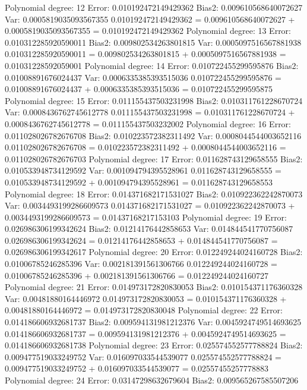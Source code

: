 \documentclass[letterpaper,10pt,english]{sphinxmanual}
\begin{document}
\begin{sphinxVerbatim}[commandchars=\\\{\}]
Polynomial degree: 12
Error: 0.010192472149429362
Bias\PYGZca{}2: 0.009610568640072627
Var: 0.0005819035093567355
0.010192472149429362 \PYGZgt{}= 0.009610568640072627 + 0.0005819035093567355 = 0.010192472149429362
Polynomial degree: 13
Error: 0.010312285920590011
Bias\PYGZca{}2: 0.009802534263801815
Var: 0.0005097516567881938
0.010312285920590011 \PYGZgt{}= 0.009802534263801815 + 0.0005097516567881938 = 0.01031228592059001
Polynomial degree: 14
Error: 0.010722455299595876
Bias\PYGZca{}2: 0.01008891676024437
Var: 0.0006335385393515036
0.010722455299595876 \PYGZgt{}= 0.01008891676024437 + 0.0006335385393515036 = 0.010722455299595875
Polynomial degree: 15
Error: 0.011155437503231998
Bias\PYGZca{}2: 0.010311761228670724
Var: 0.0008436762745612778
0.011155437503231998 \PYGZgt{}= 0.010311761228670724 + 0.0008436762745612778 = 0.011155437503232002
Polynomial degree: 16
Error: 0.011028026782676708
Bias\PYGZca{}2: 0.010223572382311492
Var: 0.0008044544003652116
0.011028026782676708 \PYGZgt{}= 0.010223572382311492 + 0.0008044544003652116 = 0.011028026782676703
Polynomial degree: 17
Error: 0.011628743129658555
Bias\PYGZca{}2: 0.010533948734129592
Var: 0.001094794395528961
0.011628743129658555 \PYGZgt{}= 0.010533948734129592 + 0.001094794395528961 = 0.011628743129658553
Polynomial degree: 18
Error: 0.014371682171531027
Bias\PYGZca{}2: 0.010922362242870073
Var: 0.0034493199286609573
0.014371682171531027 \PYGZgt{}= 0.010922362242870073 + 0.0034493199286609573 = 0.01437168217153103
Polynomial degree: 19
Error: 0.026986306199342624
Bias\PYGZca{}2: 0.01214176442858653
Var: 0.014844541770756087
0.026986306199342624 \PYGZgt{}= 0.01214176442858653 + 0.014844541770756087 = 0.026986306199342617
Polynomial degree: 20
Error: 0.012249244024160728
Bias\PYGZca{}2: 0.01006785246285396
Var: 0.002181391561306766
0.012249244024160728 \PYGZgt{}= 0.01006785246285396 + 0.002181391561306766 = 0.012249244024160727
Polynomial degree: 21
Error: 0.014973172820830053
Bias\PYGZca{}2: 0.010154371176360328
Var: 0.00481880164446972
0.014973172820830053 \PYGZgt{}= 0.010154371176360328 + 0.00481880164446972 = 0.014973172820830048
Polynomial degree: 22
Error: 0.014186606932681737
Bias\PYGZca{}2: 0.009594131981212376
Var: 0.0045924749514693625
0.014186606932681737 \PYGZgt{}= 0.009594131981212376 + 0.0045924749514693625 = 0.014186606932681738
Polynomial degree: 23
Error: 0.025574552577788824
Bias\PYGZca{}2: 0.009477519033249752
Var: 0.016097033544539077
0.025574552577788824 \PYGZgt{}= 0.009477519033249752 + 0.016097033544539077 = 0.02557455257778883
Polynomial degree: 24
Error: 0.03147298632679604
Bias\PYGZca{}2: 0.009565267585507206

\end{sphinxVerbatim}
\end{document}
